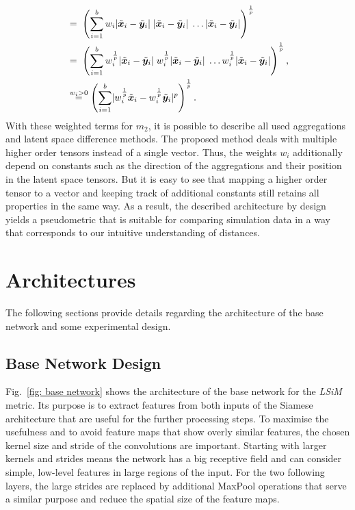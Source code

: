 \begin{align*}
    &=\; \left( \sum_{i=1}^{b} w_i \lvert \tilde{{\bm{x}}}_i - \tilde{{\bm{y}}}_i \rvert \; \lvert \tilde{{\bm{x}}}_i - \tilde{{\bm{y}}}_i \rvert \; \ldots \lvert \tilde{{\bm{x}}}_i - \tilde{{\bm{y}}}_i \rvert \right) ^ \frac{1}{p} \\
    &=\; \left( \sum_{i=1}^{b} w_i^\frac{1}{p} \lvert \tilde{{\bm{x}}}_i - \tilde{{\bm{y}}}_i \rvert \; w_i^\frac{1}{p} \lvert \tilde{{\bm{x}}}_i - \tilde{{\bm{y}}}_i \rvert \; \ldots w_i^\frac{1}{p} \lvert \tilde{{\bm{x}}}_i - \tilde{{\bm{y}}}_i \rvert \right) ^ \frac{1}{p}, \\
    &\overset{w_i>0}{=} \left( \sum_{i=1}^{b} \lvert w_i^\frac{1}{p} \tilde{{\bm{x}}}_i - w_i^\frac{1}{p} \tilde{{\bm{y}}}_i \rvert^p \right) ^ \frac{1}{p}.
\end{align*}
With these weighted terms for $m_2$, it is possible to describe all used aggregations and latent space difference methods. The proposed method deals with multiple higher order tensors instead of a single vector. Thus, the weights $w_i$ additionally depend on constants such as the direction of the aggregations and their position in the latent space tensors. But it is easy to see that mapping a higher order tensor to a vector and keeping track of additional constants still retains all properties in the same way. As a result, the described architecture by design yields a pseudometric that is suitable for comparing simulation data in a way that corresponds to our intuitive understanding of distances.



\section{Architectures} \label{append: architectures}
The following sections provide details regarding the architecture of the base network and some experimental design. 


\subsection{Base Network Design} \label{append: base network}
Fig.~\ref{fig: base network} shows the architecture of the base network for the \textit{LSiM} metric. Its purpose is to extract features from both inputs of the Siamese architecture that are useful for the further processing steps. To maximise the usefulness and to avoid feature maps that show overly similar features, the chosen kernel size and stride of the convolutions are important. Starting with larger kernels and strides means the network has a big receptive field and can consider simple, low-level features in large regions of the input. For the two following layers, the large strides are replaced by additional MaxPool operations that serve a similar purpose and reduce the spatial size of the feature maps.

